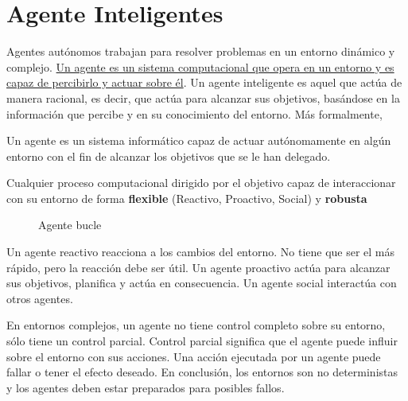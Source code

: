 \chapter{Agente Inteligentes}

Agentes autónomos trabajan para resolver problemas en un entorno dinámico y complejo. \ul{Un agente es un sistema computacional que opera en un entorno y es capaz de percibirlo y actuar sobre él}. Un agente inteligente es aquel que actúa de manera racional, es decir, que actúa para alcanzar sus objetivos, basándose en la información que percibe y en su conocimiento del entorno.
Más formalmente,
\begin{definition}
   [Wooldridge]
   Un agente es un sistema informático
   capaz de actuar autónomamente en algún
   entorno con el fin de alcanzar los objetivos
   que se le han delegado.
\end{definition}

\begin{definition}
   Cualquier proceso computacional dirigido por el objetivo capaz
   de interaccionar con su entorno de forma \textbf{flexible} (Reactivo, Proactivo, Social) y \textbf{robusta}
\end{definition}

\begin{figure}[htbp]
   \centering

   \caption{Agente bucle}
   \label{fig:agenteBucle}
\end{figure}

Un agente reactivo reacciona a los cambios del entorno. No tiene que ser el más rápido, pero la reacción debe ser útil. Un agente proactivo actúa para alcanzar sus objetivos, planifica y actúa en consecuencia. Un agente social interactúa con otros agentes.

En entornos complejos, un agente no tiene control completo sobre su entorno, sólo tiene un control parcial. Control parcial significa que el agente puede influir sobre el entorno con sus acciones. Una acción ejecutada por un agente puede fallar o tener el efecto deseado. En conclusión, los entornos son no deterministas y los agentes deben estar preparados para posibles fallos.

